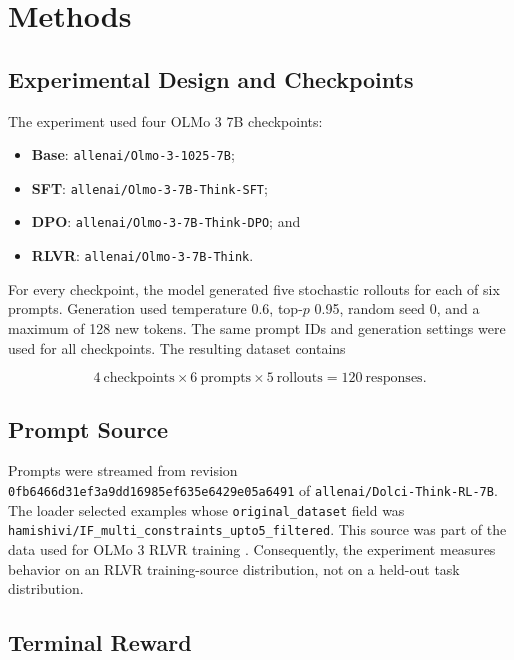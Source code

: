\documentclass[manuscript,screen,nonacm]{acmart}
\begin{document}
\section{Methods}

\subsection{Experimental Design and Checkpoints}

The experiment used four OLMo 3 7B checkpoints:

\begin{itemize}
    \item \textbf{Base}: \texttt{allenai/Olmo-3-1025-7B};
    \item \textbf{SFT}: \texttt{allenai/Olmo-3-7B-Think-SFT};
    \item \textbf{DPO}: \texttt{allenai/Olmo-3-7B-Think-DPO}; and
    \item \textbf{RLVR}: \texttt{allenai/Olmo-3-7B-Think}.
\end{itemize}

For every checkpoint, the model generated five stochastic rollouts for each of
six prompts. Generation used temperature 0.6, top-$p$ 0.95, random seed 0,
and a maximum of 128 new tokens. The same prompt IDs and generation settings
were used for all checkpoints. The resulting dataset contains

\begin{equation}
4\ \text{checkpoints}\times 6\ \text{prompts}\times
5\ \text{rollouts}=120\ \text{responses}.
\end{equation}

\subsection{Prompt Source}

Prompts were streamed from revision
\texttt{0fb6466d31ef3a9dd16985ef635e6429e05a6491} of
\texttt{allenai/Dolci-Think-RL-7B}. The loader selected examples whose
\texttt{original\_dataset} field was
\texttt{hamishivi/IF\_multi\_constraints\_upto5\_filtered}. This source was
part of the data used for OLMo 3 RLVR training \citep{dolcirl}. Consequently,
the experiment measures behavior on an RLVR training-source distribution, not
on a held-out task distribution.

\subsection{Terminal Reward}
\end{document}
